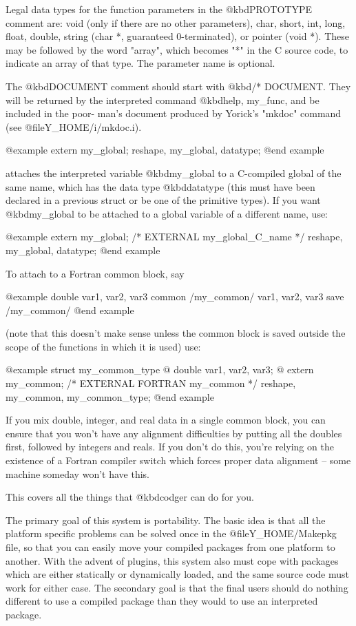 Legal data types for the function parameters in the @kbd{PROTOTYPE}
comment are: void (only if there are no other parameters), char, short,
int, long, float, double, string (char *, guaranteed 0-terminated), or
pointer (void *).  These may be followed by the word "array", which
becomes "*" in the C source code, to indicate an array of that type.
The parameter name is optional.

The @kbd{DOCUMENT} comment should start with @kbd{/* DOCUMENT}.  They
will be returned by the interpreted command @kbd{help, my_func}, and be
included in the poor- man's document produced by Yorick's "mkdoc"
command (see @file{Y_HOME/i/mkdoc.i}).

@example
extern my_global;
reshape, my_global, datatype;
@end example

attaches the interpreted variable @kbd{my_global} to a C-compiled global of
the same name, which has the data type @kbd{datatype} (this must have been
declared in a previous struct or be one of the primitive types).  If you
want @kbd{my_global} to be attached to a global variable of a different
name, use:

@example
extern my_global;
/* EXTERNAL my_global_C_name */
reshape, my_global, datatype;
@end example

To attach to a Fortran common block, say

@example
        double var1, var2, var3
        common /my_common/ var1, var2, var3
        save /my_common/
@end example

(note that this doesn't make sense unless the common block is saved outside
the scope of the functions in which it is used) use:

@example
struct my_common_type @{ double var1, var2, var3; @}
extern my_common;
/* EXTERNAL FORTRAN my_common */
reshape, my_common, my_common_type;
@end example

If you mix double, integer, and real data in a single common block, you
can ensure that you won't have any alignment difficulties by putting
all the doubles first, followed by integers and reals.  If you don't do
this, you're relying on the existence of a Fortran compiler switch which
forces proper data alignment -- some machine someday won't have this.

This covers all the things that @kbd{codger} can do for you.

The primary goal of this system is portability.  The basic idea is
that all the platform specific problems can be solved once in the
@file{Y_HOME/Makepkg} file, so that you can easily move your compiled
packages from one platform to another.  With the advent of plugins,
this system also must cope with packages which are either statically
or dynamically loaded, and the same source code must work for either
case.  The secondary goal is that the final users should do nothing
different to use a compiled package than they would to use an
interpreted package.

